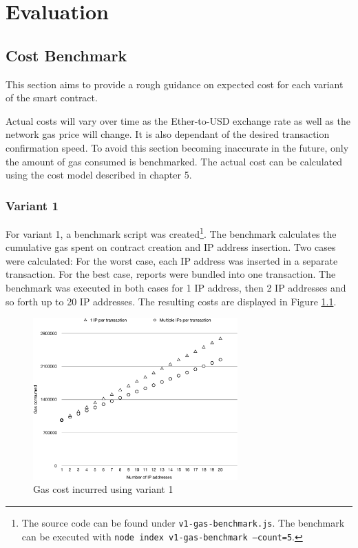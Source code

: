 \chapter{Evaluation}

\section{Cost Benchmark}

This section aims to provide a rough guidance on expected cost for each variant of the smart contract.

Actual costs will vary over time as the Ether-to-USD exchange rate as well as the network gas price will change. It is also dependant of the desired transaction confirmation speed. To avoid this section becoming inaccurate in the future, only the amount of gas consumed is benchmarked. The actual cost can be calculated using the cost model described in chapter 5.

\subsection{Variant 1}
For variant 1, a benchmark script was created\footnote{The source code can be found under \texttt{v1-gas-benchmark.js}. The benchmark can be executed with \texttt{node index v1-gas-benchmark --count=5}.}. The benchmark calculates the cumulative gas spent on contract creation and IP address insertion. Two cases were calculated: For the worst case, each IP address was inserted in a separate transaction. For the best case, reports were bundled into one transaction. The benchmark was executed in both cases for 1 IP address, then 2 IP addresses and so forth up to 20 IP addresses. The resulting costs are displayed in Figure \ref{fig:v1-gas-cost}.

\begin{figure}[H]
\centering
\includegraphics[width=0.7\textwidth]{v1-gas-cost.pdf}
\caption{Gas cost incurred using variant 1}
\label{fig:v1-gas-cost}
\end{figure}

